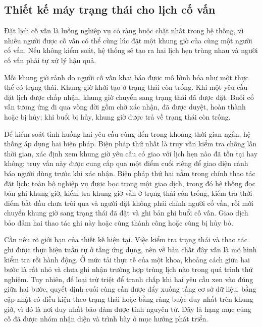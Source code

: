 \documentclass[12pt,a4paper,oneside]{report}
\begin{document}
\subsection{Thiết kế máy trạng thái cho lịch cố vấn}

Đặt lịch cố vấn là luồng nghiệp vụ có ràng buộc chặt nhất trong hệ thống, vì nhiều người được cố vấn có thể cùng lúc đặt một khung giờ của cùng một người cố vấn. Nếu không kiểm soát, hệ thống sẽ tạo ra hai lịch hẹn trùng nhau và người cố vấn phải tự xử lý hậu quả.

Mỗi khung giờ rảnh do người cố vấn khai báo được mô hình hóa như một thực thể có trạng thái. Khung giờ khởi tạo ở trạng thái còn trống. Khi một yêu cầu đặt lịch được chấp nhận, khung giờ chuyển sang trạng thái đã được đặt. Buổi cố vấn tương ứng đi qua vòng đời gồm chờ xác nhận, đã được duyệt, hoàn thành hoặc bị hủy; khi buổi bị hủy, khung giờ được trả về trạng thái còn trống.

Để kiểm soát tình huống hai yêu cầu cùng đến trong khoảng thời gian ngắn, hệ thống áp dụng hai biện pháp. Biện pháp thứ nhất là truy vấn kiểm tra chồng lấn thời gian, xác định xem khung giờ yêu cầu có giao với lịch hẹn nào đã tồn tại hay không; truy vấn này được cung cấp qua một điểm cuối riêng để giao diện cảnh báo người dùng trước khi xác nhận. Biện pháp thứ hai nằm trong chính thao tác đặt lịch: toàn bộ nghiệp vụ được bọc trong một giao dịch, trong đó hệ thống đọc bản ghi khung giờ, kiểm tra khung giờ vẫn ở trạng thái còn trống, kiểm tra thời điểm bắt đầu chưa trôi qua và người đặt không phải chính người cố vấn, rồi mới chuyển khung giờ sang trạng thái đã đặt và ghi bản ghi buổi cố vấn. Giao dịch bảo đảm hai thao tác ghi này hoặc cùng thành công hoặc cùng bị hủy bỏ.

Cần nêu rõ giới hạn của thiết kế hiện tại. Việc kiểm tra trạng thái và thao tác ghi được thực hiện tuần tự ở tầng ứng dụng, nên về bản chất đây vẫn là mô hình kiểm tra rồi hành động. Ở mức tải thực tế của một khoa, khoảng cách giữa hai bước là rất nhỏ và chưa ghi nhận trường hợp trùng lịch nào trong quá trình thử nghiệm. Tuy nhiên, để loại trừ triệt để tranh chấp khi hai yêu cầu xen vào đúng giữa hai bước, quyết định cuối cùng cần được đẩy xuống tầng cơ sở dữ liệu, bằng cập nhật có điều kiện theo trạng thái hoặc bằng ràng buộc duy nhất trên khung giờ, vì đó là nơi duy nhất bảo đảm được tính nguyên tử. Đây là hạng mục củng cố đã được nhóm nhận diện và trình bày ở mục hướng phát triển.
\end{document}
